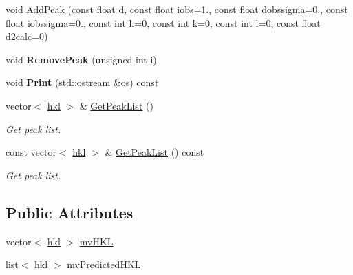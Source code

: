 \begin{DoxyCompactItemize}
\item 
void \mbox{\hyperlink{class_obj_cryst_1_1_peak_list_a825e83f775144bdbe0d558789af02d97}{Add\+Peak}} (const float d, const float iobs=1., const float dobssigma=0., const float iobssigma=0., const int h=0, const int k=0, const int l=0, const float d2calc=0)
\item 
\mbox{\label{class_obj_cryst_1_1_peak_list_a1b87305d81488c71ea877c9ccf182cc4}} 
void {\bfseries Remove\+Peak} (unsigned int i)
\item 
\mbox{\label{class_obj_cryst_1_1_peak_list_a063cd490cc8baaede693b1255493cb98}} 
void {\bfseries Print} (std\+::ostream \&os) const
\item 
\mbox{\label{class_obj_cryst_1_1_peak_list_a68999a6748f5bc5c4cd185f843ac4550}} 
vector$<$ \mbox{\hyperlink{struct_obj_cryst_1_1_peak_list_1_1hkl}{hkl}} $>$ \& \mbox{\hyperlink{class_obj_cryst_1_1_peak_list_a68999a6748f5bc5c4cd185f843ac4550}{Get\+Peak\+List}} ()
\begin{DoxyCompactList}\small\item\em Get peak list. \end{DoxyCompactList}\item 
\mbox{\label{class_obj_cryst_1_1_peak_list_ada8e7974cd4a8db3bc54ba22e8f7bcaf}} 
const vector$<$ \mbox{\hyperlink{struct_obj_cryst_1_1_peak_list_1_1hkl}{hkl}} $>$ \& \mbox{\hyperlink{class_obj_cryst_1_1_peak_list_ada8e7974cd4a8db3bc54ba22e8f7bcaf}{Get\+Peak\+List}} () const
\begin{DoxyCompactList}\small\item\em Get peak list. \end{DoxyCompactList}\end{DoxyCompactItemize}
\subsection*{Public Attributes}
\begin{DoxyCompactItemize}
\item 
vector$<$ \mbox{\hyperlink{struct_obj_cryst_1_1_peak_list_1_1hkl}{hkl}} $>$ \mbox{\hyperlink{class_obj_cryst_1_1_peak_list_a810ed3eb6c76a08488ace8b530529631}{mv\+H\+KL}}
\item 
list$<$ \mbox{\hyperlink{struct_obj_cryst_1_1_peak_list_1_1hkl}{hkl}} $>$ \mbox{\hyperlink{class_obj_cryst_1_1_peak_list_a7e3d44332948bcd9565089aa8172c009}{mv\+Predicted\+H\+KL}}
\end{DoxyCompactItemize}


